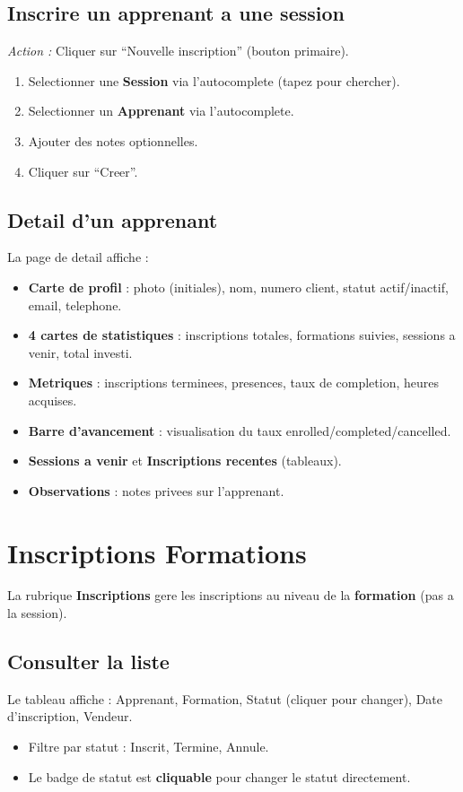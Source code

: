 \documentclass[a4paper,11pt]{article}
\newcommand{\etape}[1]{\textcolor{step}{\textbf{\'Etape :} #1}}
\newcommand{\action}[1]{\textcolor{brand}{\textit{Action :} #1}}
\begin{document}
\subsection{Inscrire un apprenant a une session}
\action{Cliquer sur ``Nouvelle inscription'' (bouton primaire).}
\begin{enumerate}[label=\etape{\arabic*}]
  \item Selectionner une \textbf{Session} via l'autocomplete (tapez pour chercher).
  \item Selectionner un \textbf{Apprenant} via l'autocomplete.
  \item Ajouter des notes optionnelles.
  \item Cliquer sur ``Creer''.
\end{enumerate}

\subsection{Detail d'un apprenant}
La page de detail affiche :

\begin{itemize}
  \item \textbf{Carte de profil} : photo (initiales), nom, numero client, statut actif/inactif, email, telephone.
  \item \textbf{4 cartes de statistiques} : inscriptions totales, formations suivies, sessions a venir, total investi.
  \item \textbf{Metriques} : inscriptions terminees, presences, taux de completion, heures acquises.
  \item \textbf{Barre d'avancement} : visualisation du taux enrolled/completed/cancelled.
  \item \textbf{Sessions a venir} et \textbf{Inscriptions recentes} (tableaux).
  \item \textbf{Observations} : notes privees sur l'apprenant.
\end{itemize}


\section{Inscriptions Formations}

La rubrique \textbf{Inscriptions} gere les inscriptions au niveau de la \textbf{formation} (pas a la session).

\subsection{Consulter la liste}
Le tableau affiche : Apprenant, Formation, Statut (cliquer pour changer), Date d'inscription, Vendeur.
\begin{itemize}
  \item Filtre par statut : Inscrit, Termine, Annule.
  \item Le badge de statut est \textbf{cliquable} pour changer le statut directement.
\end{itemize}
\end{document}
